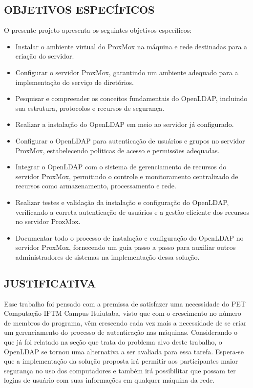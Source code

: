 \subsection{OBJETIVOS ESPECÍFICOS}
\label{subsec:objetivos-específicos}
O presente projeto apresenta os seguintes objetivos específicos:
\begin{itemize}
    \item Instalar o ambiente virtual do ProxMox na máquina e rede destinadas para 
    a criação do servidor.
	\item Configurar o servidor ProxMox, garantindo um ambiente adequado para a implementação do serviço de diretórios.
    \item Pesquisar e compreender os conceitos fundamentais do OpenLDAP, incluindo sua estrutura, protocolos e recursos de segurança.
    \item Realizar a instalação do OpenLDAP em meio ao servidor já configurado.
    \item Configurar o OpenLDAP para autenticação de usuários e grupos no servidor ProxMox, estabelecendo políticas de acesso e permissões adequadas.
    \item Integrar o OpenLDAP com o sistema de gerenciamento de recursos do servidor ProxMox, permitindo o controle e monitoramento centralizado de recursos como armazenamento, processamento e rede.
    \item Realizar testes e validação da instalação e configuração do OpenLDAP, verificando a correta autenticação de usuários e a gestão eficiente dos recursos no servidor ProxMox.
    \item Documentar todo o processo de instalação e configuração do OpenLDAP no servidor ProxMox, fornecendo um guia passo a passo para auxiliar outros administradores de sistemas na implementação dessa solução.
\end{itemize}

\subsection{JUSTIFICATIVA}
\label{subsec:justificativa}
Esse trabalho foi pensado com a premissa de satisfazer uma necessidade do PET Computação IFTM Campus Ituiutaba, visto que com o crescimento no número de membros do programa, vêm crescendo cada vez mais a necessidade de se criar um gerenciamento do processo de autenticação nas máquinas. Considerando o que já foi relatado na seção que trata do problema alvo deste trabalho, o OpenLDAP se tornou uma alternativa a ser avaliada para essa tarefa. Espera-se que a implementação da solução proposta irá permitir aos participantes maior segurança no uso dos computadores e também irá possibilitar que possam ter logins de usuário com suas informações em qualquer máquina da rede.

